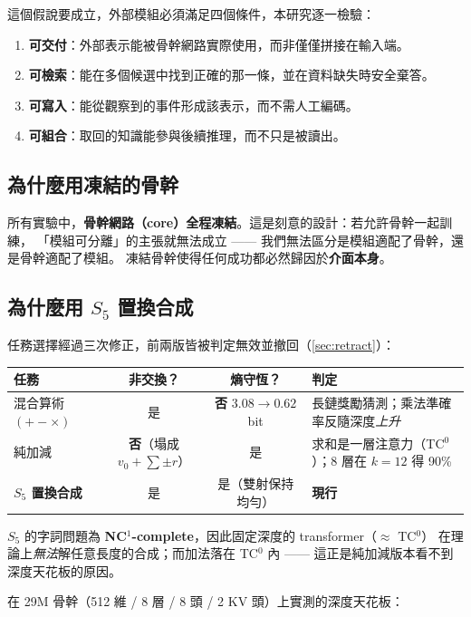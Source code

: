 \documentclass[11pt, a4paper]{article}
\begin{document}
這個假說要成立，外部模組必須滿足四個條件，本研究逐一檢驗：

\begin{enumerate}
  \item \textbf{可交付}：外部表示能被骨幹網路實際使用，而非僅僅拼接在輸入端。
  \item \textbf{可檢索}：能在多個候選中找到正確的那一條，並在資料缺失時安全棄答。
  \item \textbf{可寫入}：能從觀察到的事件形成該表示，而不需人工編碼。
  \item \textbf{可組合}：取回的知識能參與後續推理，而不只是被讀出。
\end{enumerate}

\subsection{為什麼用凍結的骨幹}

所有實驗中，\textbf{骨幹網路（core）全程凍結}。這是刻意的設計：若允許骨幹一起訓練，
「模組可分離」的主張就無法成立 —— 我們無法區分是模組適配了骨幹，還是骨幹適配了模組。
凍結骨幹使得任何成功都必然歸因於\textbf{介面本身}。

\subsection{為什麼用 $S_5$ 置換合成}

任務選擇經過三次修正，前兩版皆被判定無效並撤回（\autoref{sec:retract}）：

\begin{table}[h]
\centering
\small
\begin{tabular}{lccl}
\toprule
任務 & 非交換？ & 熵守恆？ & 判定 \\
\midrule
混合算術 $(+-\times)$ & 是 & \textbf{否} $3.08 \to 0.62$ bit & 長鏈獎勵猜測；乘法準確率反隨深度\emph{上升} \\
純加減 & \textbf{否}（塌成 $v_0 + \sum \pm r$）& 是 & 求和是一層注意力（TC$^0$）；8 層在 $k{=}12$ 得 90\% \\
\textbf{$S_5$ 置換合成} & 是 & 是（雙射保持均勻）& \textbf{現行} \\
\bottomrule
\end{tabular}
\end{table}

$S_5$ 的字詞問題為 \textbf{NC$^1$-complete}，因此固定深度的 transformer（$\approx$ TC$^0$）
在理論上\emph{無法}解任意長度的合成；而加法落在 TC$^0$ 內 —— 這正是純加減版本看不到深度天花板的原因。

在 29M 骨幹（512 維 / 8 層 / 8 頭 / 2 KV 頭）上實測的深度天花板：
\end{document}
